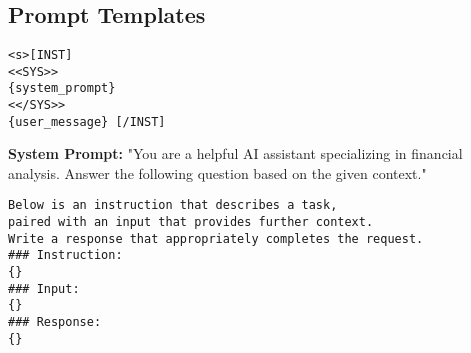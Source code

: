 \documentclass[logo,msc]{infthesis}           %
\begin{document}



\appendix

\chapter{}

\section{Prompt Templates}
\label{sec:Prompt template-combined}

\begin{tcolorbox}[
    breakable,
    enhanced,
    colback=blue!5!white,
    colframe=white!75!black,
    width=\textwidth,
    boxrule=0.5mm,
    left=2pt,
    right=2pt,
    top=2pt,
    bottom=2pt,
    title=LLAMA2-7B-CHAT-HF Prompt,
    fonttitle=\bfseries\small,
    coltitle=black,
    toptitle=1mm,
    bottomtitle=1mm
]
\begin{lstlisting}[language={}, basicstyle=\ttfamily\small, breaklines=true, breakatwhitespace=true]
<s>[INST]
<<SYS>>
{system_prompt}
<</SYS>>
{user_message} [/INST]
\end{lstlisting}

\small
\textbf{System Prompt:} "You are a helpful AI assistant specializing in financial analysis. Answer the following question based on the given context."
\end{tcolorbox}

\begin{tcolorbox}[
    breakable,
    enhanced,
    colback=blue!5!white,
    colframe=white!75!black,
    width=\textwidth,
    boxrule=0.5mm,
    left=2pt,
    right=2pt,
    top=2pt,
    bottom=2pt,
    title=LLAMA3-8B Prompt,
    fonttitle=\bfseries\small,
    coltitle=black,
    toptitle=1mm,
    bottomtitle=1mm
]
\begin{lstlisting}[language={}, basicstyle=\ttfamily\small, breaklines=true, breakatwhitespace=true]
Below is an instruction that describes a task, 
paired with an input that provides further context. 
Write a response that appropriately completes the request.
### Instruction:
{}
### Input:
{}
### Response:
{}
\end{lstlisting}
\end{tcolorbox}
\end{document}
